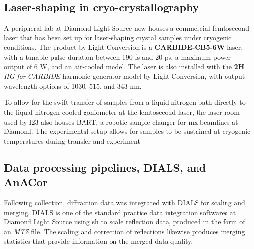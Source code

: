 
\subsection{Laser-shaping in cryo-crystallography}
A peripheral lab at Diamond Light Source now houses a commercial femtosecond laser  that has been set up for laser-shaping crystal samples under cryogenic conditions. The product by Light Conversion is a \textbf{CARBIDE-CB5-6W} laser, with a tunable pulse duration between 190 \unit{fs} and 20 \unit{ps}, a maximum power output of 6 \unit{W}, and an air-cooled model. The laser is also installed with the \textbf{2H} \textit{HG for CARBIDE} harmonic generator model by Light Conversion, with output wavelength options of 1030, 515, and 343 \unit{nm}.%

To allow for the swift transfer of samples from a liquid nitrogen bath directly to the liquid nitrogen-cooled goniometer at the femtosecond laser, the laser room used by I23 also houses \href{https://www.diamond.ac.uk/Home/Corporate-Literature/Annual-Review/Review2015/Villages/Macromolecular-Crystallography-Village/Macromolecular-Crystallography-Village-Developments/BART---the-new-robotic-sample-changer-for-MX-beamlines-at-Diamond.html}{BART}, a robotic sample changer for \ac{mx} beamlines at Diamond. The experimental setup allows for samples to be sustained at cryogenic temperatures during transfer and experiment.

\subsection{Data processing pipelines, DIALS, and AnACor}

Following collection, diffraction data was integrated with DIALS for scaling and merging. DIALS is one of the standard practice data integration softwares at Diamond Light Source using \ac{sh} to scale reflection data, produced in the form of an \textit{MTZ} file. The scaling and correction of reflections likewise produces merging statistics that provide information on the merged data quality.%

